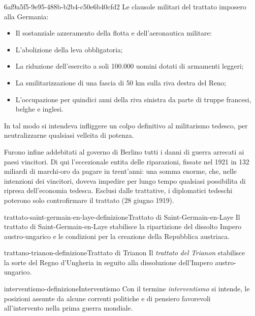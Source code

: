 \documentclass[preview]{standalone}
\begin{document}
\begin{snippet}{6af9a5f5-9e95-488b-b2b4-c50e6b40cfd2}
    Le clausole militari del trattato imposero alla Germania:
    \begin{itemize}
        \item Il sostanziale azzeramento della flotta e dell'aeronautica militare:
        \item L'abolizione della leva obbligatoria;
        \item La riduzione dell'esercito a soli 100.000 uomini dotati di armamenti leggeri;
        \item La smilitarizzazione di una fascia di 50 km sulla riva destra del Reno;
        \item L'occupazione per quindici anni della riva sinistra da parte di truppe francesi, belghe e inglesi.
    \end{itemize}
    
    In tal modo si intendeva infliggere un colpo definitivo al militarismo tedesco, per neutralizzarne
    qualsiasi velleita di potenza.
    
    Furono infine addebitati al governo di Berlino tutti i danni di guerra arrecati ai paesi vincitori.
    Di qui l'eccezionale entita delle riparazioni, fissate nel 1921 in 132 miliardi di marchi-oro da
    pagare in trent'anni: una somma enorme, che, nelle intenzioni dei vincitori, doveva impedire
    per lungo tempo qualsiasi possibilita di ripresa dell'economia tedesca. Esclusi dalle trattative, i
    diplomatici tedeschi poterono solo controfirmare il trattato (28 giugno 1919).
\end{snippet}

\begin{snippetdefinition}{trattato-saint-germain-en-laye-definizione}{Trattato di Saint-Germain-en-Laye}
    Il trattato di Saint-Germain-en-Laye
    stabilisce la ripartizione del dissolto Impero austro-ungarico
    e le condizioni per la creazione della Repubblica austriaca. 
\end{snippetdefinition}

\begin{snippetdefinition}{trattano-trianon-definizione}{Trattato di Trianon}
    Il \textit{trattato del Trianon} stabilisce la sorte
    del Regno d'Ungheria in seguito alla dissoluzione dell'Impero austro-ungarico. 
\end{snippetdefinition}


\begin{snippetdefinition}{interventismo-definizione}{Interventismo}
    Con il termine \textit{interventismo} si intende,
    le posizioni assunte da alcune correnti politiche e di pensiero
    favorevoli all'intervento nella prima guerra mondiale.
\end{snippetdefinition}
\end{document}

